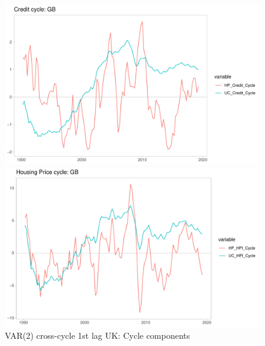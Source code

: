 \documentclass[fleqn]{article}
\begin{document}
\begin{outline}[enumerate]
		\begin{figure}[h!]
			\caption{VAR(2) cross-cycle 1st lag UK: Cycle components}	
			\centerline{\includegraphics[scale=0.7]{../../Regression/VAR_2_crosscycle_1stlagonly/Output/Graphs/Credit_cycle_GB.pdf}}
			\centerline{\includegraphics[scale=0.7]{../../Regression/VAR_2_crosscycle_1stlagonly/Output/Graphs/HP_Cycle_GB.pdf}}
		\end{figure}
		

\end{outline}
\end{document}
